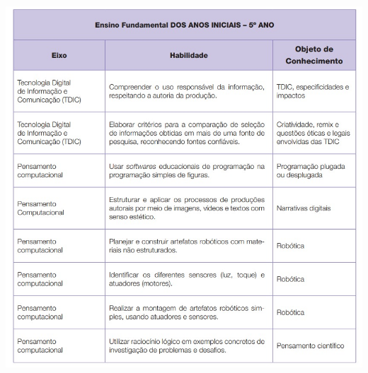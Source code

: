 \begin{center}
	\includegraphics[height=\textheight]{./IMG-GIT/ano-5.jpeg}
\end{center}

\pagebreak

%

\pagebreak

